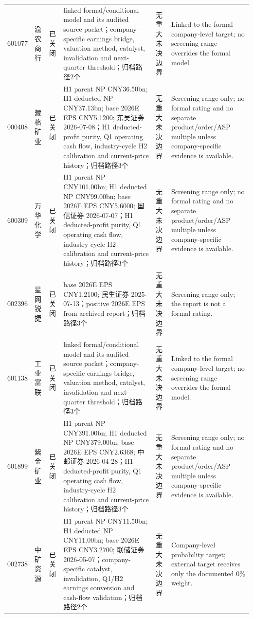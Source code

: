 \begin{longtable}{L{1.00cm}L{1.40cm}L{1.45cm}L{2.85cm}L{2.50cm}L{3.05cm}}
601077 & 渝农商行 & 已关闭 & linked formal/conditional model and its audited source packet；company-specific earnings bridge, valuation method, catalyst, invalidation and next-quarter threshold；归档路径2个 & 无重大未决边界 & Linked to the formal company-level target; no screening range overrides the formal model. \\
000408 & 藏格矿业 & 已关闭 & H1 parent NP CNY36.50bn; H1 deducted NP CNY37.13bn; base 2026E EPS CNY5.1200; 东吴证券 2026-07-08；H1 deducted-profit purity, Q1 operating cash flow, industry-cycle H2 calibration and current-price history；归档路径3个 & 无重大未决边界 & Screening range only; no formal rating and no separate product/order/ASP multiple unless company-specific evidence is available. \\
600309 & 万华化学 & 已关闭 & H1 parent NP CNY101.00bn; H1 deducted NP CNY99.00bn; base 2026E EPS CNY5.6000; 国信证券 2026-07-07；H1 deducted-profit purity, Q1 operating cash flow, industry-cycle H2 calibration and current-price history；归档路径3个 & 无重大未决边界 & Screening range only; no formal rating and no separate product/order/ASP multiple unless company-specific evidence is available. \\
002396 & 星网锐捷 & 已关闭 & base 2026E EPS CNY1.2100; 民生证券 2025-07-13；positive 2026E EPS from archived report；归档路径3个 & 无重大未决边界 & Screening range only; the report is not a formal rating. \\
601138 & 工业富联 & 已关闭 & linked formal/conditional model and its audited source packet；company-specific earnings bridge, valuation method, catalyst, invalidation and next-quarter threshold；归档路径3个 & 无重大未决边界 & Linked to the formal company-level target; no screening range overrides the formal model. \\
601899 & 紫金矿业 & 已关闭 & H1 parent NP CNY391.00bn; H1 deducted NP CNY379.00bn; base 2026E EPS CNY2.6368; 中邮证券 2026-04-28；H1 deducted-profit purity, Q1 operating cash flow, industry-cycle H2 calibration and current-price history；归档路径3个 & 无重大未决边界 & Screening range only; no formal rating and no separate product/order/ASP multiple unless company-specific evidence is available. \\
002738 & 中矿资源 & 已关闭 & H1 parent NP CNY11.50bn; H1 deducted NP CNY11.00bn; base 2026E EPS CNY3.2700; 联储证券 2026-05-07；company-specific catalyst, invalidation, Q1/H2 earnings conversion and cash-flow validation；归档路径2个 & 无重大未决边界 & Company-level probability target; external target receives only the documented 0\% weight. \\

\end{longtable}
